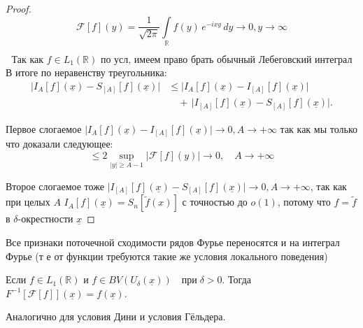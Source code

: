 \begin{proof}
\[
\mathcal{F} \left[ f \right](y)  = \frac{1}{\sqrt{2 \pi}} \int\limits_{\mathbb{R}} f(y) \, e^{-ixy} \, dy \longrightarrow 0, y \longrightarrow \infty
\]

\[
\text{Так как }  f \in L_1(\mathbb{R}) \text{ по усл, имеем право брать обычный Лебеговский интеграл}
\]
В итоге по неравенству треугольника:
\[
\begin{aligned}
\bigl|I_{A}[f](\underline{x}) - S_{[A]}[f](\underline{x})\bigr|
&\le
\bigl|I_{A}[f](\underline{x}) - I_{[A]}[f](\underline{x})\bigr|\\
&\quad
+\,\bigl|I_{[A]}[f](\underline{x}) - S_{[A]}[f](\underline{x})\bigr|.
\end{aligned}
\]

Первое слогаемое $\bigl|I_{A}[f](\underline{x}) - I_{[A]}[f](\underline{x})\bigr| \rightarrow
 0, A \rightarrow +\infty$ так как мы только что доказали следующее:
 \[
\leq 2 \sup_{|y| \geq A-1} \left| \mathcal{F} [f](y) \right| \longrightarrow 0, \quad A \rightarrow +\infty
\]

Второе слогаемое тоже $\bigl|I_{[A]}[f](\underline{x}) - S_{[A]}[f](\underline{x})\bigr| \rightarrow 0, A \rightarrow +\infty$, так как при целых $A$ $I_A[f](\underline{x}) = S_n[\widetilde{f}(x)]$ с точностью до $o(1)$, потому что $f = \widetilde{f}$ в $\delta$-окрестности $\underline{x}$


\end{proof}

\begin{corollary}
Все признаки поточечной сходимости рядов Фурье переносятся и на интеграл Фурье (т е от функции требуются такие же условия локального поведения)
\end{corollary}

\begin{example}
Если \( f \in L_1(\mathbb{R}) \) и 
$f \in BV(U_{\delta}(\underline{x})) \quad \text{при} \; \delta > 0.$
Тогда
$F^{-1}\left[\mathcal{F}[f]\right](\underline{x}) = f(\underline{x}).$

Аналогично для условия Дини и условия Гёльдера.

\end{example}

 


